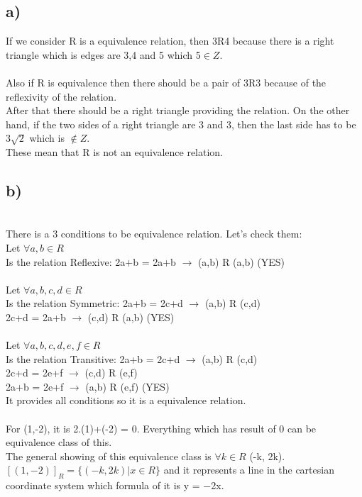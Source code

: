 \documentclass[12pt]{article}
\begin{document}
\subsection*{a) }
If we consider R is a equivalence relation, then 3R4 because there is a right triangle which is edges are 3,4 and 5 which 5$\in Z$. \\
\\
Also if R is equivalence then there should be a pair of 3R3 because of the reflexivity of the relation.\\
After that there should be a right triangle providing the relation. On the other hand, if the two sides of a right triangle are 3 and 3, then the last side has to be $3\sqrt{2}$ which is $\notin Z$. \\
These mean that R is not an equivalence relation.
\subsection*{b) }\\
There is a 3 conditions to be equivalence relation. Let's check them:\\
Let $\forall a, b \in R$\\
Is the relation Reflexive: 2a+b = 2a+b $\longrightarrow$ (a,b) R (a,b) (YES)\\
\\
Let $\forall a,b,c,d \in R$\\
Is the relation Symmetric: 2a+b = 2c+d $\longrightarrow$ (a,b) R (c,d) \\
                            2c+d = 2a+b $\longrightarrow$ (c,d) R (a,b) (YES)\\
                            \\
Let $\forall a,b,c,d,e,f \in R$\\
Is the relation Transitive: 2a+b = 2c+d $\longrightarrow$  (a,b) R (c,d) \\
                            2c+d = 2e+f $\longrightarrow$ (c,d) R (e,f)\\
                           2a+b = 2e+f $\longrightarrow$ (a,b) R (e,f) (YES)\\
It provides all conditions so it is a equivalence relation.\\
\\
For (1,-2), it is 2.(1)+(-2) = 0. Everything which has result of 0 can be equivalence class of this.\\
The general showing of this equivalence class is $\forall k \in R$ (-k, 2k).\\
$[(1, −2)]_R = \{(-k, 2k)|x\in R\}$ and it represents a line in the cartesian coordinate system which formula of it is y = −2x.\\
\end{document}
